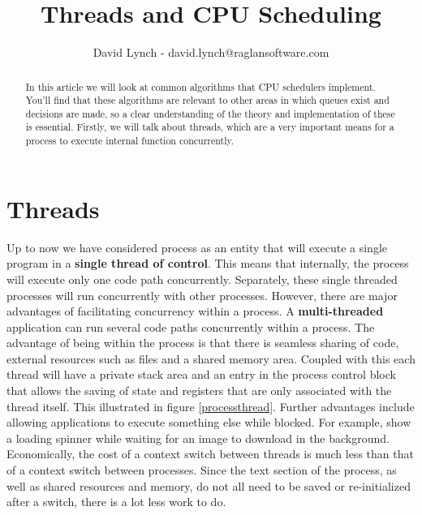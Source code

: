 \documentclass[10pt,a4paper]{article}
\title{Threads and CPU Scheduling}
\author{David Lynch - david.lynch@raglansoftware.com }
\begin{document}
\maketitle
\begin{abstract}
In this article we will look at common algorithms that CPU schedulers implement. You'll find that these algorithms are relevant to other areas in which queues exist and decisions are made, so a clear understanding of the theory and implementation of these is essential. Firstly, we will talk about threads, which are a very important means for a process to execute internal function concurrently. 
\end{abstract}
\section{Threads}
Up to now we have considered process as an entity that will execute a single program in a {\bf single thread of control}. This means that internally, the process will execute only one code path concurrently. Separately, these single threaded processes will run concurrently with other processes. However, there are major advantages of facilitating concurrency within a process. A {\bf multi-threaded} application can run several code paths concurrently within a process. The advantage of being within the process is that there is seamless sharing of code, external resources such as files and a shared memory area. Coupled with this each thread will have a private stack area and an entry in the process control block that allows the saving of state and registers that are only associated with the thread itself. This illustrated in figure \ref{processthread}. Further advantages include allowing applications to execute something else while blocked. For example, show a loading spinner while waiting for an image to download in the background. Economically, the cost of a context switch between threads is much less than that of a context switch between processes. Since the text section of the process, as well as shared resources and memory, do not all need to be saved or re-initialized after a switch, there is a lot less work to do. 
\end{document}
